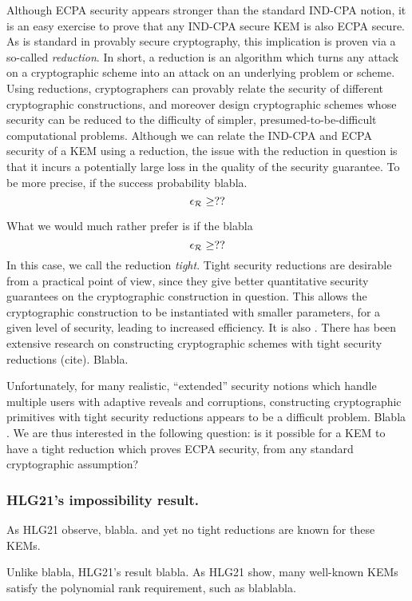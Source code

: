 Although ECPA security appears stronger than the standard IND-CPA notion,
it is an easy exercise to prove that any IND-CPA secure KEM is also ECPA secure.
As is standard in provably secure cryptography, this implication is proven via a so-called \emph{reduction}.
In short, a reduction is an algorithm which turns any attack on a cryptographic scheme
into an attack on an underlying problem or scheme.
Using reductions,
cryptographers can provably relate the security of different cryptographic constructions,
and moreover design cryptographic schemes
whose security can be reduced to the difficulty of simpler,
presumed-to-be-difficult computational problems.
Although we can relate the IND-CPA and ECPA security of a KEM using a reduction,
the issue with the reduction in question is that it incurs a potentially large loss
in the quality of the security guarantee. To be more precise,
if the success probability blabla.
\[
  \epsilon_{\redR} \ge ??
\]

What we would much rather prefer is if the blabla
\[
  \epsilon_{\redR} \ge ??
\]
In this case, we call the reduction \emph{tight}.
Tight security reductions are desirable from a practical point of view,
since they give better quantitative security guarantees on the cryptographic construction in question.
This allows the cryptographic construction to be instantiated with smaller parameters, for a given level of security,
leading to increased efficiency.
It is also .
There has been extensive research on constructing cryptographic schemes with tight security reductions (cite).
Blabla.

Unfortunately,
for many realistic, ``extended'' security notions which handle multiple users with adaptive reveals and corruptions,
constructing cryptographic primitives with tight security reductions appears to be a difficult problem.
Blabla .
We are thus interested in the following question: is it possible for a KEM to have a tight reduction
which proves ECPA security, from any standard cryptographic assumption?

\subsubsection{HLG21's impossibility result.}

As HLG21 observe, blabla.
and yet no tight reductions are known for these KEMs.

Unlike blabla, HLG21's result blabla.
As HLG21 show, many well-known KEMs satisfy the polynomial rank requirement, such as blablabla.

